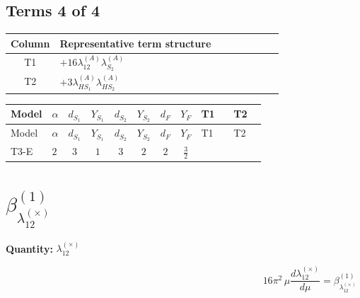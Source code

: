 \documentclass[8pt]{article}
\begin{document}
\begin{landscape}
\subsection*{Terms 4 of 4}
\begin{center}
\begin{tabular}{@{}c >{\raggedright\arraybackslash}p{0.82\linewidth}@{}}
\toprule
Column & Representative term structure \\
\midrule
T1 & \(\displaystyle +16 {\lambda_{12}^{(A)}} {\lambda_{S_2}^{(A)}}\) \\
\midrule
T2 & \(\displaystyle +3 {\lambda_{HS_1}^{(A)}} {\lambda_{HS_2}^{(A)}}\) \\
\midrule
\bottomrule
\end{tabular}
\end{center}
\smallskip
\tiny
\begin{longtable}{@{}llcccccc >{\raggedright\arraybackslash}p{0.21\linewidth} >{\raggedright\arraybackslash}p{0.21\linewidth}@{}}
\toprule
Model & $\alpha$ & $d_{S_1}$ & $Y_{S_1}$ & $d_{S_2}$ & $Y_{S_2}$ & $d_F$ & $Y_F$ & T1 & T2 \\
\midrule
\endfirsthead
\toprule
Model & $\alpha$ & $d_{S_1}$ & $Y_{S_1}$ & $d_{S_2}$ & $Y_{S_2}$ & $d_F$ & $Y_F$ & T1 & T2 \\
\midrule
\endhead
T3-E & $2$ & $3$ & $1$ & $3$ & $2$ & $2$ & $\frac{3}{2}$ & \scriptsize\adjustbox{max width=\linewidth}{$\begin{gathered} +16 {\lambda_{12}^{(A)}} {\lambda_{S_2}^{(A)}}\end{gathered}$} & \scriptsize\adjustbox{max width=\linewidth}{$\begin{gathered} +3 {\lambda_{HS_1}^{(A)}} {\lambda_{HS_2}^{(A)}}\end{gathered}$} \\
\midrule
\bottomrule
\end{longtable}
\clearpage
\section*{$\beta_{\lambda_{12}^{(\times)}}^{(1)}$}
\noindent\textbf{Quantity: }$\lambda_{12}^{(\times)}$\par\smallskip
\[16\pi^2\,\mu\frac{d \lambda_{12}^{(\times)}}{d\mu}=\beta_{\lambda_{12}^{(\times)}}^{(1)}\]

\end{landscape}
\end{document}
